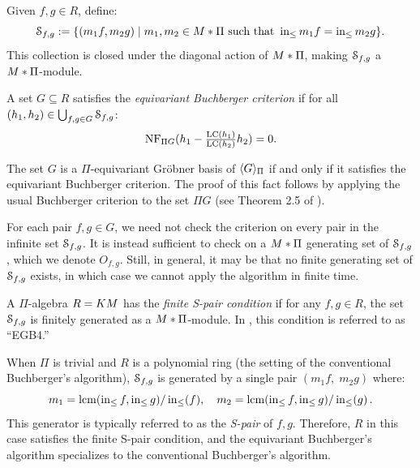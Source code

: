 Given $f,g \in R$, define:
 \[ \mathcal S_{f,g} := \{(m_1f,m_2g) \mid m_1,m_2 \in M * \Pi \text{ such that } \operatorname{in}_{\leq} m_1f = \operatorname{in}_{\leq} m_2g\}. \]
This collection is closed under the diagonal action of $M *\Pi$, making $\mathcal S_{f,g}$ a $M *\Pi$-module.  

\begin{definition}\label{def:buchberger-criterion}
A set $G \subseteq R$ satisfies the {\em equivariant Buchberger criterion} if for all $(h_1,h_2) \in \bigcup_{f,g\in G} \mathcal S_{f,g}$:
 \[ \operatorname{NF}_{\Pi G}(h_1 - \tfrac{\operatorname{LC}(h_1)}{\operatorname{LC}(h_2)}h_2) = 0. \]
\end{definition}

The set $G$ is a $\Pi$-equivariant Gr\"obner basis of $\langle G \rangle_{\Pi}$ if and only if it satisfies the equivariant Buchberger criterion.  The proof of this fact follows by applying the usual Buchberger criterion to the set $\Pi G$ (see Theorem 2.5 of \cite{Brouwer09e}).

For each pair $f,g \in G$, we need not check the criterion on every pair in the infinite set $\mathcal S_{f,g}$.  It is instead sufficient to check on a $M * \Pi$ generating set of $\mathcal S_{f,g}$, which we denote $O_{f,g}$.  Still, in general, it may be that no finite generating set of $\mathcal S_{f,g}$ exists, in which case we cannot apply the algorithm in finite time.

\begin{definition}\label{def:finite-s-pair}
 A $\Pi$-algebra $R = KM$ has the {\em finite S-pair condition} if for any $f,g \in R$, the set $\mathcal S_{f,g}$ is finitely generated as a $M * \Pi$-module.  In \cite{Brouwer09e}, this condition is referred to as ``EGB4.''
\end{definition}

When $\Pi$ is trivial and $R$ is a polynomial ring (the setting of the conventional Buchberger's algorithm), $\mathcal S_{f,g}$ is generated by a single pair $(m_1 f,\; m_2 g)$ where:
$$
m_1 = \operatorname{lcm}(\operatorname{in}_{\leq} f, \operatorname{in}_{\leq} g)/\operatorname{in}_{\leq}(f),\quad
m_2 = \operatorname{lcm}(\operatorname{in}_{\leq} f, \operatorname{in}_{\leq} g)/\operatorname{in}_{\leq}(g)
\,.
$$  
This generator is typically referred to as the {\em S-pair} of $f,g$.  Therefore, $R$ in this case satisfies the finite S-pair condition, and the equivariant Buchberger's algorithm specializes to the conventional Buchberger's algorithm.


